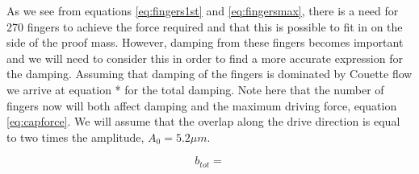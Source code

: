 \documentclass[12pt,a4paper,titlepage]{article}
\begin{document}
\begin{spacing}{1.1}
As we see from equations \ref{eq:fingers1st} and \ref{eq:fingersmax}, there is a need for 270 fingers to achieve the force required and that this is possible to fit in on the side of the proof mass. However, damping from these fingers becomes important and we will need to consider this in order to find a more accurate expression for the damping. Assuming that damping of the fingers is dominated by Couette flow we arrive at equation * for the total damping. Note here that the number of fingers now will both affect damping and the maximum driving force, equation \ref{eq:capforce}. We will assume that the overlap along the drive direction is equal to two times the amplitude, $A_0 = 5.2 \mu m$.

\begin{equation}
b_{tot} = 
\end{equation}
\end{spacing}
\printbibliography
\end{document}
